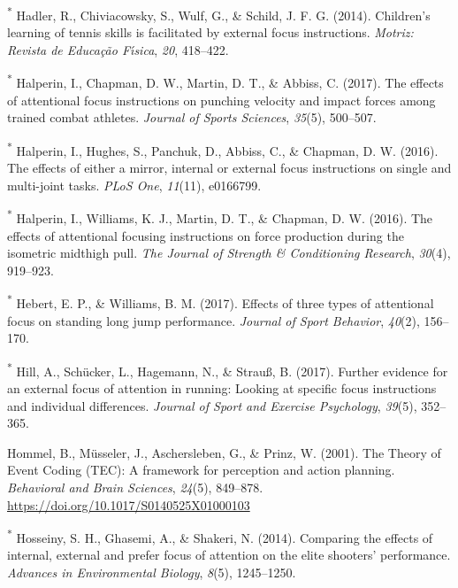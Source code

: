 \documentclass[
  man, donotrepeattitle,floatsintext]{apa7}
\newlength{\cslhangindent}
\newlength{\cslentryspacingunit} %
\newenvironment{CSLReferences}[2] %
 {%
  \setlength{\parindent}{0pt}
  \ifodd #1
  \let\oldpar\par
  \def\par{\hangindent=\cslhangindent\oldpar}
  \fi
  \setlength{\parskip}{#2\cslentryspacingunit}
 }%
 {}
\begin{document}
\begin{CSLReferences}{1}{0}
\leavevmode{}%
\textsuperscript{*} Hadler, R., Chiviacowsky, S., Wulf, G., \& Schild, J. F. G. (2014). Children's learning of tennis skills is facilitated by external focus instructions. \emph{Motriz: Revista de Educa{ç}{ã}o F{ı́}sica}, \emph{20}, 418--422.

\leavevmode{}%
\textsuperscript{*} Halperin, I., Chapman, D. W., Martin, D. T., \& Abbiss, C. (2017). The effects of attentional focus instructions on punching velocity and impact forces among trained combat athletes. \emph{Journal of Sports Sciences}, \emph{35}(5), 500--507.

\leavevmode{}%
\textsuperscript{*} Halperin, I., Hughes, S., Panchuk, D., Abbiss, C., \& Chapman, D. W. (2016). The effects of either a mirror, internal or external focus instructions on single and multi-joint tasks. \emph{PLoS One}, \emph{11}(11), e0166799.

\leavevmode{}%
\textsuperscript{*} Halperin, I., Williams, K. J., Martin, D. T., \& Chapman, D. W. (2016). The effects of attentional focusing instructions on force production during the isometric midthigh pull. \emph{The Journal of Strength \& Conditioning Research}, \emph{30}(4), 919--923.

\leavevmode{}%
\textsuperscript{*} Hebert, E. P., \& Williams, B. M. (2017). Effects of three types of attentional focus on standing long jump performance. \emph{Journal of Sport Behavior}, \emph{40}(2), 156--170.

\leavevmode{}%
\textsuperscript{*} Hill, A., Schücker, L., Hagemann, N., \& Strauß, B. (2017). Further evidence for an external focus of attention in running: Looking at specific focus instructions and individual differences. \emph{Journal of Sport and Exercise Psychology}, \emph{39}(5), 352--365.

\leavevmode{}%
Hommel, B., Müsseler, J., Aschersleben, G., \& Prinz, W. (2001). The {Theory} of {Event Coding} ({TEC}): {A} framework for perception and action planning. \emph{Behavioral and Brain Sciences}, \emph{24}(5), 849--878. \url{https://doi.org/10.1017/S0140525X01000103}

\leavevmode{}%
\textsuperscript{*} Hosseiny, S. H., Ghasemi, A., \& Shakeri, N. (2014). Comparing the effects of internal, external and prefer focus of attention on the elite shooters' performance. \emph{Advances in Environmental Biology}, \emph{8}(5), 1245--1250.


\end{CSLReferences}
\end{document}
